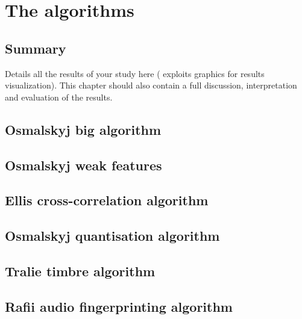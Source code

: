 
\chapter{The algorithms}
\label{chap:algorithms}
\ifpdf
    \graphicspath{{Algorithms/Figures/PNG/}{EvaluationTask/Figures/PDF/}{Algorithms/Figures/}}
\else
    \graphicspath{{Algorithms/Figures/EPS/}{EvaluationTask/Figures/}}
\fi


\section*{Summary}
Details all the results of your study here ( exploits graphics for results visualization). 
This chapter should also contain a full discussion, interpretation and evaluation of the results. 



\section{Osmalskyj big algorithm} 
\label{sec:osmalskyj}
\section{Osmalskyj weak features} 
\label{sec:weakfeatures}
\section{Ellis cross-correlation algorithm} 
\label{sec:ccs}
\section{Osmalskyj quantisation algorithm} 
\label{sec:quantisation}
\section{Tralie timbre algorithm} 
\label{sec:timbre}
\section{Rafii audio fingerprinting algorithm} 
\label{sec:rafii}


